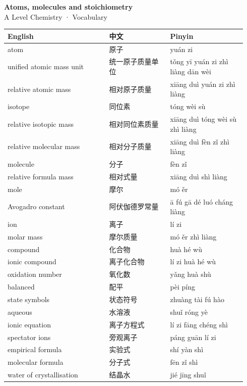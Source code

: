 \documentclass[11pt]{article}
\begin{document}
\begin{center}
  {\LARGE\bfseries Atoms, molecules and stoichiometry}\\[0.35em]
  {\large A Level Chemistry · Vocabulary}
\end{center}
\vspace{0.6em}

\begin{longtable}{@{}p{0.40\linewidth}p{0.24\linewidth}p{0.30\linewidth}@{}}
\toprule
\textbf{English} & \textbf{中文} & \textbf{Pinyin} \\
\midrule
\endhead
\bottomrule
\endlastfoot
atom & 原子 & yuán zi \\
unified atomic mass unit & 统一原子质量单位 & tǒng yī yuán zi zhì liàng dān wèi \\
relative atomic mass & 相对原子质量 & xiāng duì yuán zi zhì liàng \\
isotope & 同位素 & tóng wèi sù \\
relative isotopic mass & 相对同位素质量 & xiāng duì tóng wèi sù zhì liàng \\
relative molecular mass & 相对分子质量 & xiāng duì fèn zǐ zhì liàng \\
molecule & 分子 & fèn zǐ \\
relative formula mass & 相对式量 & xiāng duì shì liàng \\
mole & 摩尔 & mó ěr \\
Avogadro constant & 阿伏伽德罗常量 & ā fú gā dé luó cháng liàng \\
ion & 离子 & lí zi \\
molar mass & 摩尔质量 & mó ěr zhì liàng \\
compound & 化合物 & huà hé wù \\
ionic compound & 离子化合物 & lí zi huà hé wù \\
oxidation number & 氧化数 & yǎng huà shù \\
balanced & 配平 & pèi píng \\
state symbols & 状态符号 & zhuàng tài fú hào \\
aqueous & 水溶液 & shuǐ róng yè \\
ionic equation & 离子方程式 & lí zi fāng chéng shì \\
spectator ions & 旁观离子 & páng guān lí zi \\
empirical formula & 实验式 & shí yàn shì \\
molecular formula & 分子式 & fēn zǐ shì \\
water of crystallisation & 结晶水 & jié jīng shuǐ \\

\end{longtable}
\end{document}
